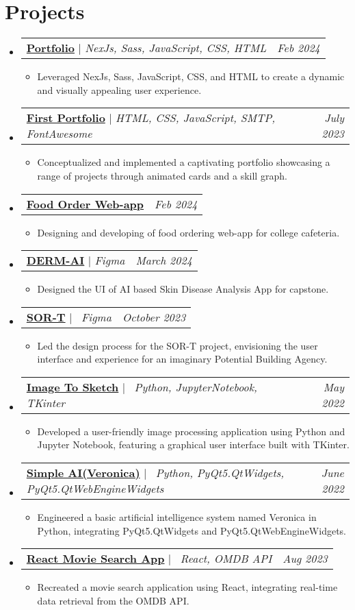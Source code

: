 \documentclass[letterpaper,10pt]{article}
\makeatletter
\newcommand{\subheadingtitlevspace}{
\vspace{-3pt}
}
\newcommand{\resumeItem}[1]{
  \item{
    {#1 \vspace{-4pt}}
  }
}
\newcommand{\titleItem}[1]{
  \textbf{#1}
}
\newcommand{\resumeProjectHeading}[2]{
    \item
    \begin{tabular*}{0.97\textwidth}{l@{\extracolsep{\fill}}r}
      #1 & \textit{ #2} \\
    \end{tabular*}\vspace{-9pt}
}
\newcommand{\resumeSubHeadingListStart}{\subheadingtitlevspace\begin{itemize}[leftmargin=0.15in, label={}]}
\newcommand{\resumeSubHeadingListEnd}{\end{itemize}}
\newcommand{\resumeItemListStart}{
\begin{itemize}}
\newcommand{\resumeItemListEnd}{
\end{itemize}\vspace{-8pt}}
\makeatother
\begin{document}
 \section{Projects}    
     \resumeSubHeadingListStart
        \resumeProjectHeading
           {\titleItem{\href{https://rishilahoti.vercel.app/}{Portfolio}} $|$ \emph{NexJs, Sass, JavaScript, CSS, HTML}}{Feb 2024}
            \resumeItemListStart
	\resumeItem{Leveraged NexJs, Sass, JavaScript, CSS, and HTML to create a dynamic and visually appealing user experience.}
           \resumeItemListEnd
       \resumeProjectHeading
           {\titleItem{\href{https://github.com/rishilahoti/Portfolio}{First Portfolio}} $|$ \emph{HTML, CSS, JavaScript, SMTP, FontAwesome}}{July 2023}
            \resumeItemListStart
            \resumeItem{Conceptualized and implemented a captivating portfolio showcasing a range of projects through animated cards and a skill graph.}
           \resumeItemListEnd
      \resumeProjectHeading
           {\titleItem{\href{https://www.figma.com/file/sbPGg7Yz9J2dJvGEHYJywa/PESU-Food-Cart}{Food Order Web-app}}}{Feb 2024}
            \resumeItemListStart
            \resumeItem{Designing and developing of food ordering web-app for college cafeteria.}
           \resumeItemListEnd
      \resumeProjectHeading
           {\titleItem{\href{https://www.figma.com/file/WQQI1jeAoWfYemWjE0hKaC/DERM-AI}{DERM-AI}} $|$ \emph{Figma}}{March 2024}
            \resumeItemListStart
            \resumeItem{Designed the UI of AI based Skin Disease Analysis App for capstone.}
           \resumeItemListEnd
       \resumeProjectHeading
        {\titleItem{\href{https://www.figma.com/community/file/1302966544079637232/sort-community}{SOR-T}} $|$ \emph{\ Figma}}{October 2023}
            \resumeItemListStart
            \resumeItem{Led the design process for the SOR-T project, envisioning the user interface and experience for an imaginary Potential Building Agency. }
           \resumeItemListEnd
        \resumeProjectHeading
         {\titleItem{\href{https://github.com/rishilahoti/Image2Sketch}{Image To Sketch}} $|$ \emph{\ Python, JupyterNotebook, TKinter}}{May 2022}
            \resumeItemListStart
            \resumeItem{Developed a user-friendly image processing application using Python and Jupyter Notebook, featuring a graphical user interface built with TKinter. }
           \resumeItemListEnd
           \resumeProjectHeading
         {\titleItem{\href{https://github.com/rishilahoti/veronica}{Simple AI(Veronica)}} $|$ \emph{\ Python, PyQt5.QtWidgets, PyQt5.QtWebEngineWidgets}}{June 2022}
            \resumeItemListStart
            \resumeItem{Engineered a basic artificial intelligence system named Veronica in Python, integrating PyQt5.QtWidgets and PyQt5.QtWebEngineWidgets. }
           \resumeItemListEnd
           \resumeProjectHeading
         {\titleItem{\href{https://github.com/rishilahoti/react-movie-enhanced}{React Movie Search App}} $|$ \emph{\ React, OMDB API}}{Aug 2023}
            \resumeItemListStart
            \resumeItem{Recreated a movie search application using React, integrating real-time data retrieval from the OMDB API. }
           \resumeItemListEnd
     \resumeSubHeadingListEnd
\end{document}
